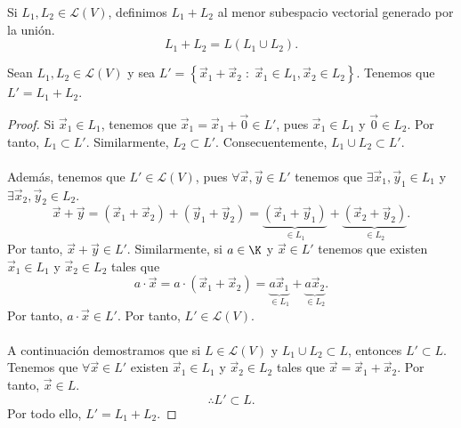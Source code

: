 \begin{fdefinition}[]
	\normalfont Si $\displaystyle L_{1}, L_{2} \in \mathcal{L}\left(V\right) $, definimos $\displaystyle L_{1}+L_{2} $ al menor subespacio vectorial generado por la unión.
	\[L_{1}+L_{2} = L\left(L_{1} \cup L_{2}\right) .\]
\end{fdefinition}

\begin{ftheorem}[]
	\normalfont Sean $\displaystyle L_{1}, L_{2} \in \mathcal{L}\left(V\right) $ y sea $\displaystyle L' = \left\{ \vec{x}_{1} + \vec{x}_{2} \; : \; \vec{x}_{1} \in L_{1}, \vec{x}_{2} \in L_{2}\right\}  $. Tenemos que $\displaystyle L' = L_{1} + L_{2} $.
\end{ftheorem}

\begin{proof}
Si $\displaystyle \vec{x}_{1}\in L_{1} $, tenemos que $\displaystyle \vec{x}_{1} = \vec{x}_{1} + \vec{0} \in L' $, pues $\displaystyle \vec{x}_{1}\in L_{1} $ y $\displaystyle \vec{0} \in L_{2} $. Por tanto, $\displaystyle L_{1}\subset L' $. Similarmente, $\displaystyle L_{2} \subset L' $. Consecuentemente, $\displaystyle L_{1}\cup L_{2} \subset L' $. \\ \\
Además, tenemos que $\displaystyle L' \in \mathcal{L}\left(V\right) $, pues $\displaystyle \forall \vec{x}, \vec{y} \in L' $ tenemos que $\displaystyle \exists \vec{x}_{1},\vec{y}_{1}\in L_{1} $ y $\displaystyle \exists \vec{x}_{2}, \vec{y}_{2} \in L_{2} $. 
\[\vec{x} + \vec{y} = \left(\vec{x}_{1} + \vec{x}_{2}\right) + \left(\vec{y}_{1}+ \vec{y}_{2}\right) = \underbrace{\left(\vec{x}_{1} + \vec{y}_{1}\right)}_{\in L_{1}} + \underbrace{\left(\vec{x}_{2} + \vec{y}_{2}\right)}_{\in L_{2}} .\]
Por tanto, $\displaystyle \vec{x} + \vec{y} \in L' $. Similarmente, si $\displaystyle a \in \K $ y $\displaystyle \vec{x} \in L' $ tenemos que existen $\displaystyle \vec{x}_{1} \in L_{1} $ y $\displaystyle \vec{x}_{2} \in L_{2} $ tales que 
\[a \cdot \vec{x} = a \cdot \left(\vec{x}_{1} + \vec{x}_{2}\right) = \underbrace{a\vec{x}_{1}}_{\in L_{1}}+\underbrace{a\vec{x}_{2}}_{\in L_{2}} .\]
Por tanto, $\displaystyle a \cdot \vec{x} \in L' $. Por tanto, $\displaystyle L' \in \mathcal{L}\left(V\right) $. \\\\
A continuación demostramos que si $\displaystyle L \in \mathcal{L}\left(V\right) $ y $\displaystyle L_{1}\cup L_{2}\subset L $, entonces $\displaystyle L' \subset L $.  Tenemos que $\displaystyle \forall\vec{x}\in L' $ existen $\displaystyle \vec{x}_{1}\in L_{1} $ y $\displaystyle \vec{x}_{2}\in L_{2} $ tales que $\displaystyle \vec{x} = \vec{x}_{1}+\vec{x}_{2} $. Por tanto, $\displaystyle \vec{x} \in L $.
\[\therefore L ' \subset L .\]
Por todo ello, $\displaystyle L' = L_{1}+L_{2} $.
\end{proof}

